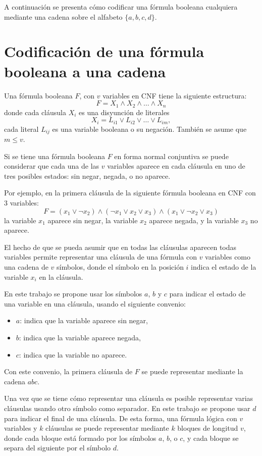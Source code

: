 A continuación se presenta cómo codificar una fórmula booleana cualquiera mediante una cadena sobre el alfabeto $\{a,b,c,d\}$.

\section{Codificación de una fórmula booleana a una cadena}
\label{sec:codsat}

Una fórmula booleana $F$, con $v$ variables en CNF tiene la siguiente estructura:
$$F=X_1 \wedge X_2 \wedge \ldots \wedge X_n$$
donde cada cláusula $X_i$ es una disyunción de literales
$$X_i=L_{i1} \vee L_{i2} \vee \ldots \vee L_{im},$$
cada literal $L_{ij}$ es una variable booleana o su negación. También se asume que $m\leq v$. 

Si se tiene una fórmula booleana $F$ en forma normal conjuntiva se puede considerar que cada una de las $v$ variables aparece en cada cláusula en uno de tres posibles estados: sin negar, negada, o no aparece.

Por ejemplo, en la primera cláusula de la siguiente fórmula booleana en CNF con 3 variables:
$$F=(x_1 \vee \neg x_2) \wedge (\neg x_1 \vee x_2 \vee x_3) \wedge (x_1 \vee \neg x_2 \vee x_3)$$
la variable $x_1$ aparece sin negar, la variable $x_2$ aparece negada, y la variable $x_{3}$ no aparece.

El hecho de que se pueda asumir que en todas las cláusulas aparecen todas variables permite representar una cláusula de una fórmula con $v$ variables como una cadena de $v$ símbolos, donde el símbolo en la posición $i$ indica el estado de la variable $x_i$ en la cláusula.

En este trabajo se propone usar los símbolos $a$, $b$ y $c$ para indicar el estado de una variable en una cláusula, usando el siguiente convenio:

\begin{itemize}
    \item $a$: indica que la variable aparece sin negar,
    \item $b$: indica que la variable aparece negada,
    \item $c$: indica que la variable no aparece.
\end{itemize}

Con este convenio, la primera cláusula de $F$ se puede representar mediante la cadena $abc$.

Una vez que se tiene cómo representar una cláusula es posible representar varias cláusulas usando otro símbolo como separador.
En este trabajo se propone usar $d$ para indicar el final de una cláusula. De esta forma, una fórmula lógica con $v$ variables y $k$ cláusulas se puede representar mediante $k$ bloques de longitud $v$, donde cada bloque está formado por los símbolos $a$, $b$, o $c$, y cada bloque se separa del siguiente por el símbolo $d$.

